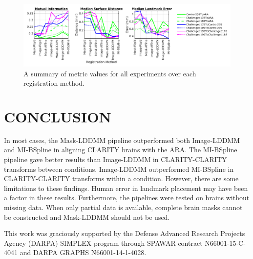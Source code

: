 \documentclass[]{spie}  %
\begin{document}
\begin{figure}[th]
 \includegraphics[width=\textwidth]{summary}
 \caption{ A summary of metric values for all experiments over each registration method. }
 \label{fig:summary}
\end{figure}

\section{CONCLUSION}
In most cases, the Mask-LDDMM pipeline outperformed both Image-LDDMM and MI-BSpline in aligning CLARITY brains with the ARA.
The MI-BSpline pipeline gave better results than Image-LDDMM in CLARITY-CLARITY transforms between conditions.
Image-LDDMM outperformed MI-BSpline in CLARITY-CLARITY transforms within a condition.
However, there are some limitations to these findings.
Human error in landmark placement may have been a factor in these results.
Furthermore, the pipelines were tested on brains without missing data.  
When only partial data is available, complete brain masks cannot be constructed and Mask-LDDMM should not be used.


\acknowledgments %
This work was graciously supported by the Defense Advanced Research Projects Agency (DARPA) SIMPLEX program through SPAWAR contract N66001-15-C-4041 and DARPA GRAPHS N66001-14-1-4028. 


\end{document}
